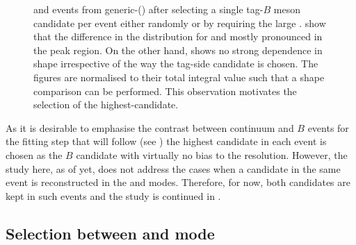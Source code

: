 \begin{figure}[htbp!]
{    and \mbox{\epem\ra\qqbar} events from generic-\MC () after selecting a single tag-$B$ meson candidate per event either randomly or by requiring the large \feiProb.
     show that the difference in the \Mbc distribution for \BptoXsgamma and \BztoXsgamma mostly pronounced in the peak region.
    On the other hand,  shows no strong dependence in shape irrespective of the way the tag-side candidate is chosen.
    The figures are normalised to their total integral value such that a shape comparison can be performed.
    This observation motivates the selection of the highest-\feiProb candidate.
    }    
\end{figure}

As it is desirable to emphasise the contrast between continuum and $B$ events for the fitting step that will follow (see )
the highest \feiProb candidate in each event is chosen as the $B$ candidate with virtually no bias to the resolution.
However, the study here, as of yet, does not address the cases when a candidate in the same event is reconstructed in the \feiBp and \feiBz modes.
Therefore, for now, both candidates are kept in such events and the study is continued in .

\subsection{Selection between \texorpdfstring{\feiBp}{feiB+} and \texorpdfstring{\feiBz}{feiB0} mode}\label{sec:select_best_candidate}

